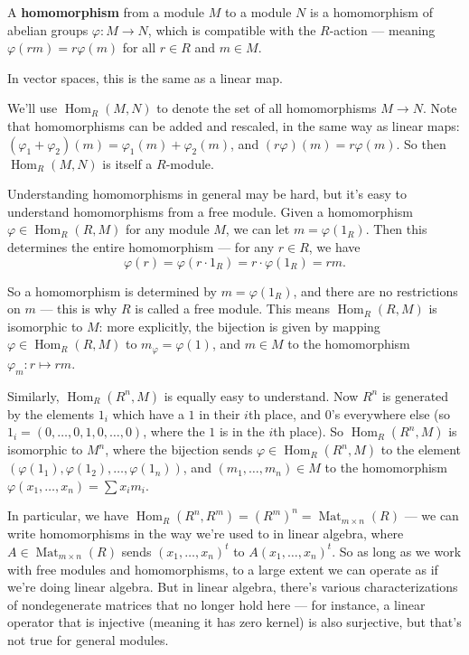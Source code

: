 \begin{definition}
    A \textbf{homomorphism} from a module $M$ to a module $N$ is a homomorphism of abelian groups $\varphi : M \to N$, which is compatible with the $R$-action --- meaning $\varphi(rm) = r\varphi(m)$ for all $r \in R$ and $m \in M$.
\end{definition}

In vector spaces, this is the same as a linear map. 

We'll use $\operatorname{Hom}_R(M, N)$ to denote the set of all homomorphisms $M \to N$. Note that homomorphisms can be added and rescaled, in the same way as linear maps: $(\varphi_1 + \varphi_2)(m) = \varphi_1(m) + \varphi_2(m)$, and $(r\varphi)(m) = r\varphi(m)$. So then $\operatorname{Hom}_R(M, N)$ is itself a $R$-module. 

Understanding homomorphisms in general may be hard, but it's easy to understand homomorphisms from a free module. Given a homomorphism $\varphi \in \operatorname{Hom}_R(R, M)$ for any module $M$, we can let $m = \varphi(1_R)$. Then this determines the entire homomorphism --- for any $r \in R$, we have \[\varphi(r) = \varphi(r\cdot 1_R) = r\cdot \varphi(1_R) = rm.\] 

So a homomorphism is determined by $m = \varphi(1_R)$, and there are no restrictions on $m$ --- this is why $R$ is called a free module. This means $\operatorname{Hom}_R(R, M)$ is isomorphic to $M$: more explicitly, the bijection is given by mapping $\varphi \in \operatorname{Hom}_R(R, M)$ to $m_\varphi = \varphi(1)$, and $m \in M$ to the homomorphism $\varphi_m : r \mapsto rm$. 

Similarly, $\operatorname{Hom}_R(R^n, M)$ is equally easy to understand. Now $R^n$ is generated by the elements $1_i$ which have a $1$ in their $i$th place, and $0$'s everywhere else (so $1_i = (0, \ldots, 0, 1, 0, \ldots, 0)$, where the $1$ is in the $i$th place). So $\operatorname{Hom}_R(R^n, M)$ is isomorphic to $M^n$, where the bijection sends $\varphi \in \operatorname{Hom}_R(R^n, M)$ to the element $(\varphi(1_1), \varphi(1_2), \ldots, \varphi(1_n))$, and $(m_1, \ldots, m_n) \in M$ to the homomorphism $\varphi(x_1, \ldots, x_n) = \sum x_im_i$. 

In particular, we have $\operatorname{Hom}_R(R^n, R^m) = (R^m)^n = \operatorname{Mat}_{m \times n}(R)$ --- we can write homomorphisms in the way we're used to in linear algebra, where $A \in \operatorname{Mat}_{m \times n}(R)$ sends $(x_1, \ldots, x_n)^t$ to $A(x_1, \ldots, x_n)^t$. So as long as we work with free modules and homomorphisms, to a large extent we can operate as if we're doing linear algebra. But in linear algebra, there's various characterizations of nondegenerate matrices that no longer hold here --- for instance, a linear operator that is injective (meaning it has zero kernel) is also surjective, but that's not true for general modules.

